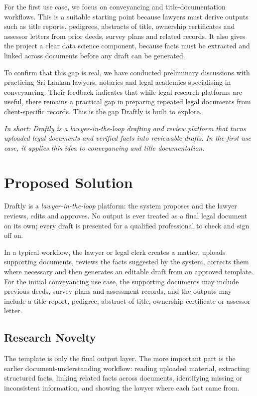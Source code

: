 \documentclass[11pt,a4paper]{article}
\begin{document}
For the first use case, we focus on conveyancing and title-documentation workflows.
This is a suitable starting point because lawyers must derive outputs such as title
reports, pedigrees, abstracts of title, ownership certificates and assessor letters from
prior deeds, survey plans and related records. It also gives the project a clear data
science component, because facts must be extracted and linked across documents before
any draft can be generated.

To confirm that this gap is real, we have conducted preliminary discussions with
practicing Sri Lankan lawyers, notaries and legal academics specialising in
conveyancing. Their feedback indicates that while legal research platforms are useful,
there remains a practical gap in preparing repeated legal documents from
client-specific records. This is the gap Draftly is built to explore.

\vspace{0.3em}
\noindent\emph{In short: Draftly is a lawyer-in-the-loop drafting and review platform
that turns uploaded legal documents and verified facts into reviewable drafts. In the
first use case, it applies this idea to conveyancing and title documentation.}

\section{Proposed Solution}

Draftly is a \emph{lawyer-in-the-loop} platform: the system proposes and the lawyer
reviews, edits and approves. No output is ever treated as a final legal document on its
own; every draft is presented for a qualified professional to check and sign off on.

In a typical workflow, the lawyer or legal clerk creates a matter, uploads supporting
documents, reviews the facts suggested by the system, corrects them where necessary and
then generates an editable draft from an approved template. For the initial
conveyancing use case, the supporting documents may include previous deeds, survey
plans and assessment records, and the outputs may include a title report, pedigree,
abstract of title, ownership certificate or assessor letter.

\subsection{Research Novelty}
The template is only the final output layer. The more important part is the earlier
document-understanding workflow: reading uploaded material, extracting structured
facts, linking related facts across documents, identifying missing or inconsistent
information, and showing the lawyer where each fact came from.
\end{document}
